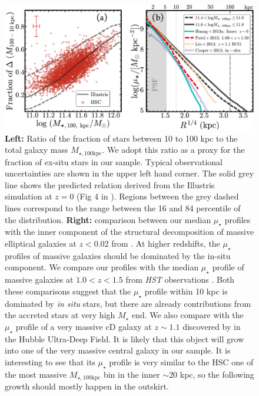 \documentclass[a4paper,fleqn,usenatbib]{mnras}
\def\mstar{{$M_{\star}$}}
\def\mtot{{$M_{\star,100\mathrm{kpc}}$}}
\def\mden{{$\mu_{\star}$}}
\begin{document}
  \begin{figure}
      \centering 
      \includegraphics[width=\textwidth]{fig/redbcg_insitu_accretion}
      \caption{
          \textbf{Left:} Ratio of the fraction of stars between 10 to 100 kpc to the 
          total galaxy mass \mtot{}. 
          We adopt this ratio as a proxy for the fraction of ex-situ stars in our 
          sample. 
          Typical observational uncertainties are shown in the upper left hand corner. 
          The solid grey line shows the predicted relation  derived from the Illustris
          simulation at $z=0$ (Fig 4 in \citealt{RodriguezGomez2016}). 
          Regions between the grey dashed lines correspond to the range between the 
          16 and 84 percentile of the distribution. 
          \textbf{Right:} comparison between our median \mden{} profiles with the 
          inner component of the structural decomposition of massive elliptical 
          galaxies at $z<0.02$ from \citet[][Cyan, solid]{Huang2013a}.
          At higher redshifts, the \mden{} profiles of massive galaxies should be 
          dominated by the in-situ component. 
          We compare our profiles with the median \mden{} profile of massive galaxies 
          at $1.0 < z < 1.5$ from \textit{HST} observations 
          \citet[][Red, dashed]{Patel2013}. 
          Both these comparisons suggest that the \mden{} profile within 10 kpc is 
          dominated by \textit{in situ} stars, but there are already contributions
          from the accreted stars at very high \mstar{} end. 
          We also compare with the \mden{} profile of a very massive cD galaxy at
          $z{\sim} 1.1$ discovered by \citet[][Yellow, dashed]{Liu2013} in the Hubble 
          Ultra-Deep Field. 
          It is likely that this object will grow into one of the very massive central
          galaxy in our sample.
          It is interesting to see that its \mden{} profile is very similar to the 
          HSC one of the most massive \mtot{} bin in the inner $\sim 20$ kpc, so the 
          following growth should mostly happen in the outskirt. 
          }
      \label{fig:discussion_1}
  \end{figure}
\end{document}
